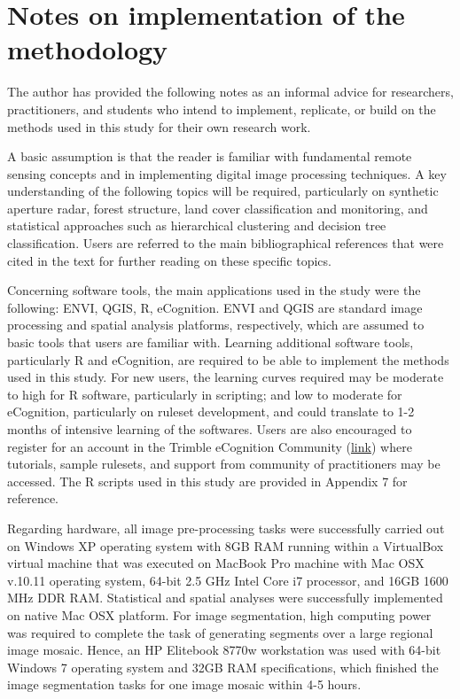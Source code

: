 \begin{appendices}
\begin{spacing}{1.0}
\begin{longtable}[h!]{ p{1cm} p{1.5cm} p{1cm} p{1.5cm} p{1cm} p{1.5cm} p{1cm} p{1.5cm} p{1cm} }
    \bottomrule
\end{longtable}
\end{spacing}


\section{Notes on implementation of the methodology}
\label{app: appendix-notes-methods}

The author has provided the following notes as an informal advice for researchers, practitioners, and students who intend to implement, replicate, or build on the methods used in this study for their own research work.

A basic assumption is that the reader is familiar with fundamental remote sensing concepts and in implementing digital image processing techniques. A key understanding of the following topics will be required, particularly on synthetic aperture radar, forest structure, land cover classification and monitoring, and statistical approaches such as hierarchical clustering and decision tree classification. Users are referred to the main bibliographical references that were cited in the text for further reading on these specific topics.

Concerning software tools, the main applications used in the study were the following: ENVI, QGIS, R, eCognition. ENVI and QGIS are standard image processing and spatial analysis platforms, respectively, which are assumed to basic tools that users are familiar with. Learning additional software tools, particularly R and eCognition, are required to be able to implement the methods used in this study. For new users, the learning curves required may be moderate to high for R software, particularly in scripting; and low to moderate for eCognition, particularly on ruleset development, and could translate to 1-2 months of intensive learning of the softwares. Users are also encouraged to register for an account in the Trimble eCognition Community (\href{http://www.ecognition.com/community}{link}) where tutorials, sample rulesets, and support from community of practitioners may be accessed. The R scripts used in this study are provided in Appendix 7 for reference.

Regarding hardware, all image pre-processing tasks were successfully carried out on Windows XP operating system with 8GB RAM running within a VirtualBox virtual machine that was executed on MacBook Pro machine with Mac OSX v.10.11 operating system, 64-bit 2.5 GHz Intel Core i7 processor, and 16GB 1600 MHz DDR RAM. Statistical and spatial analyses were successfully implemented on native Mac OSX platform. For image segmentation, high computing power was required to complete the task of generating segments over a large regional image mosaic. Hence, an HP Elitebook 8770w workstation was used with 64-bit Windows 7 operating system and 32GB RAM specifications, which finished the image segmentation tasks for one image mosaic within 4-5 hours.
\newpage



\end{appendices}
